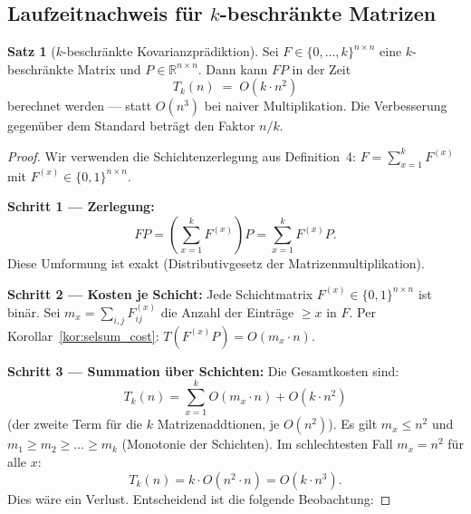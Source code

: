﻿\documentclass[a4paper,12pt]{article}
\theoremstyle{definition}
\newtheorem{satz}{Satz}
\begin{document}
\subsection{Laufzeitnachweis für $k$-beschränkte Matrizen}

\begin{satz}[$k$-beschränkte Kovarianzprädiktion]
\label{satz:kbeschr}
    Sei $F \in \{0,\ldots,k\}^{n\times n}$ eine $k$-beschränkte Matrix und
    $P \in \mathbb{R}^{n\times n}$. Dann kann $FP$ in der Zeit
    \[
        T_k(n) \;=\; O(k \cdot n^2)
    \]
    berechnet werden --- statt $O(n^3)$ bei naiver Multiplikation.
    Die Verbesserung gegenüber dem Standard beträgt den Faktor $n/k$.
\end{satz}

\begin{proof}
Wir verwenden die Schichtenzerlegung aus Definition~4:
$F = \sum_{x=1}^{k} F^{(x)}$ mit $F^{(x)} \in \{0,1\}^{n\times n}$.

\textbf{Schritt 1 --- Zerlegung:}
\[
    FP = \left(\sum_{x=1}^{k} F^{(x)}\right) P = \sum_{x=1}^{k} F^{(x)} P.
\]
Diese Umformung ist exakt (Distributivgesetz der Matrizenmultiplikation).

\textbf{Schritt 2 --- Kosten je Schicht:}
Jede Schichtmatrix $F^{(x)} \in \{0,1\}^{n\times n}$ ist binär.
Sei $m_x = \sum_{i,j} F^{(x)}_{ij}$ die Anzahl der Einträge $\geq x$ in $F$.
Per Korollar~\ref{kor:selsum_cost}: $T(F^{(x)}P) = O(m_x \cdot n)$.

\textbf{Schritt 3 --- Summation über Schichten:}
Die Gesamtkosten sind:
\[
    T_k(n) = \sum_{x=1}^{k} O(m_x \cdot n) + O(k \cdot n^2)
\]
(der zweite Term für die $k$ Matrizenaddtionen, je $O(n^2)$).
Es gilt $m_x \leq n^2$ und $m_1 \geq m_2 \geq \ldots \geq m_k$ (Monotonie der Schichten).
Im schlechtesten Fall $m_x = n^2$ für alle $x$:
\[
    T_k(n) = k \cdot O(n^2 \cdot n) = O(k \cdot n^3).
\]
Dies wäre ein Verlust. Entscheidend ist die folgende Beobachtung:


\end{proof}
\end{document}
